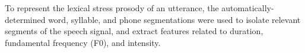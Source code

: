 \documentclass[a4paper]{article}
\begin{document}
	    To represent the lexical stress prosody of an utterance, the automatically-determined word, syllable, and phone segmentations were used to isolate relevant segments of the speech signal, and extract features related to 
	    duration, fundamental frequency (F0), and intensity. 
	    
	     
	    
\end{document}
